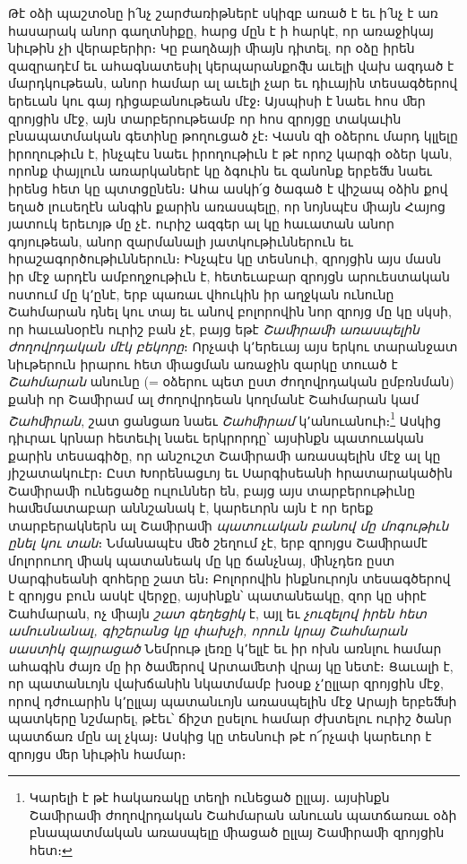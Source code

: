 \documentclass{article}
\begin{document}
{Թէ օձի պաշտօնը ի՛նչ շարժառիթներէ սկիզբ առած է եւ ի՛նչ է առ հասարակ անոր գաղտնիքը, հարց մըն է ի հարկէ, որ առաջիկայ նիւթին չի վերաբերիր։ Կը բաղձայի ﬕայն դիտել, որ օձը իրեն զազրադէմ եւ ահագնատեսիլ կերպարանքոﬖ աւելի վախ ազդած է մարդկութեան, անոր համար ալ աւելի չար եւ դիւային տեսագծերով երեւան կու գայ դիցաբանութեան մէջ։ Այսպիսի է նաեւ հոս ﬔր զրոյցին մէջ, այն տարբերութեամբ որ հոս զրոյցը տակաւին բնապատմական գետինը թողուցած չէ։ Վասն զի օձերու մարդ կլլելը իրողութիւն է, ինչպէս նաեւ իրողութիւն է թէ որոշ կարգի օձեր կան, որոնք փայլուն առարկաներէ կը ձգուին եւ զանոնք երբեﬓ նաեւ իրենց հետ կը պտտցընեն։ Ահա ասկի՛ց ծագած է վիշապ օձին քով եղած լուսեղէն անգին քարին առասպելը, որ նոյնպէս ﬕայն Հայոց յատուկ երեւոյթ մը չէ․ ուրիշ ազգեր ալ կը հաւատան անոր գոյութեան, անոր զարմանալի յատկութիւններուն եւ հրաշագործութիւններուն։ Ինչպէս կը տեսնուի, զրոյցին այս մասն իր մէջ արդէն ամբողջութիւն է, հետեւաբար զրոյցն արուեստական ոստում մը կ՚ընէ, երբ պառաւ վհուկին իր աղջկան ունունը Շահմարան դնել կու տայ եւ անով բոլորովին նոր զրոյց մը կը սկսի, որ հաւանօրէն ուրիշ բան չէ, բայց եթէ \emph{Շաﬕրաﬕ առասպելին ժողովրդական մէկ բեկորը}։ Որչափ կ՚երեւայ այս երկու տարանջատ նիւթերուն իրարու հետ ﬕացման առաջին զարկը տուած է \emph{Շահմարան} անունը (= օձերու պետ ըստ ժողովրդական ըմբռնման) քանի որ Շաﬕրամ ալ ժողովրդեան կողմանէ Շահմարան կամ \emph{Շահﬕրան}, շատ ցանցառ նաեւ \emph{Շահﬕրամ} կ՚անուանուի։\footnote{Կարելի է թէ հակառակը տեղի ունեցած ըլլայ․ այսինքն Շաﬕրաﬕ ժողովրդական Շահմարան անուան պատճառաւ օձի բնապատմական առասպելը ﬕացած ըլլայ Շաﬕրաﬕ զրոյցին հետ։} Ասկից դիւրաւ կրնար հետեւիլ նաեւ երկրորդը՝ այսինքն պատուական քարին տեսագիծը, որ անշուշտ Շաﬕրաﬕ առասպելին մէջ ալ կը յիշատակուէր։ Ըստ Խորենացւոյ եւ Սարգիսեանի հրատարակածին Շաﬕրաﬕ ունեցածը ուլուններ են, բայց այս տարբերութիւնը հաﬔմատաբար աննշանակ է, կարեւորն այն է որ երեք տարբերակներն ալ Շաﬕրաﬕ \emph{պատուական բանով մը մոգութիւն ընել կու տան}։ Նմանապէս ﬔծ շեղում չէ, երբ զրոյցս Շաﬕրամէ մոլորուող ﬕակ պատանեակ մը կը ճանչնայ, ﬕնչդեռ ըստ Սարգիսեանի զոհերը շատ են։ Բոլորովին ինքնուրոյն տեսագծերով է զրոյցս բուն ասկէ վերջը, այսինքն՝ պատանեակը, զոր կը սիրէ Շահմարան, ոչ ﬕայն \emph{շատ գեղեցիկ} է, այլ եւ \emph{չուզելով իրեն հետ ամուսնանալ, գիշերանց կը փախչի, որուն կրայ Շահմարան սաստիկ զայրացած} Նեմրութ լեռը կ՚ելլէ եւ իր ոխն առնլու համար ահագին ժայռ մը իր ծաﬔրով Արտաﬔտի վրայ կը նետէ։ Ցաւալի է, որ պատանւոյն վախճանին նկատմամբ խօսք չ՚ըլլար զրոյցին մէջ, որով դժուարին կ՚ըլլայ պատանւոյն առասպելին մէջ Արայի երբեﬓի պատկերը նշմարել, թէեւ՝ ճիշտ ըսելու համար ժխտելու ուրիշ ծանր պատճառ մըն ալ չկայ։ Ասկից կը տեսնուի թէ ո՜րչափ կարեւոր է զրոյցս ﬔր նիւթին համար։

}
\end{document}
